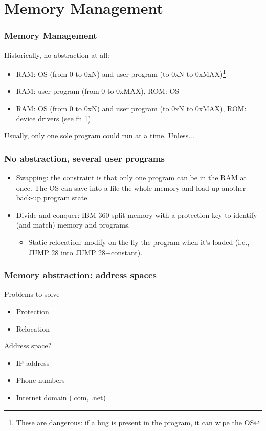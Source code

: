 \section{Memory Management}
  \begin{frame}
    \frametitle{Memory Management}
      Historically, no abstraction at all:
      \begin{itemize}
        \item RAM: OS (from 0 to 0xN) and user program (to 0xN to 0xMAX)\footnote{\label{fn:bug}These are dangerous: if a bug is present in the program, it can wipe the OS}
        \item RAM: user program (from 0 to 0xMAX), ROM: OS
        \item RAM: OS (from 0 to 0xN) and user program (to 0xN to 0xMAX), ROM: device drivers (see fn \ref{fn:bug})
      \end{itemize}
      Usually, only one sole program could run at a time. Unless...
  \end{frame}

  \begin{frame}
    \frametitle{No abstraction, several user programs}
    \begin{itemize}
      \item Swapping: the constraint is that only one program can be in the RAM at once. The OS can save into a file the whole memory and load up another back-up program state.
      \item Divide and conquer: IBM 360 split memory with a protection key to identify (and match) memory and programs.
      \begin{itemize}
        \item Static relocation: modify on the fly the program when it's loaded (i.e., JUMP 28 into JUMP 28+constant).
      \end{itemize}
    \end{itemize}
  \end{frame}

  \begin{frame}
    \frametitle{Memory abstraction: address spaces}
    \begin{block}{Problems to solve}
      \begin{itemize}
        \item Protection
        \item Relocation
      \end{itemize}
    \end{block}
    \begin{block}{Address space?}
      \begin{itemize}
        \item IP address
        \item Phone numbers
        \item Internet domain (.com, .net)
      \end{itemize}
    \end{block}
  \end{frame}


